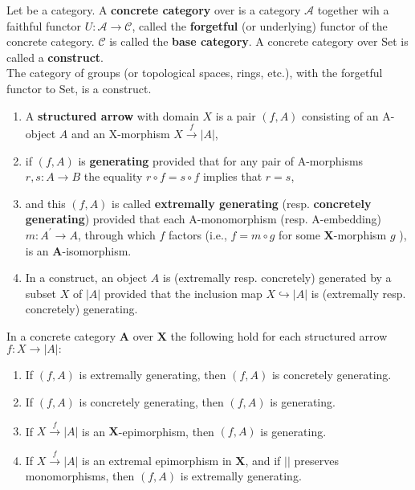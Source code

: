 \begin{example}
Let \cc be a category. A \textbf{concrete category} over \cc is a category $\mathcal{A}$ together wih a faithful functor $U: \mathcal{A} \rightarrow \mathcal{C}$, called the \textbf{forgetful} (or underlying) functor of the concrete category. $\mathcal{C}$ is called the \textbf{base category}. A concrete category over Set is called a \textbf{construct}.\\
The category of groups (or topological spaces, rings, etc.), with the forgetful functor to Set, is a construct.\\

\begin{enumerate}
    \item A \textbf{structured arrow} with domain $X$ is a pair $(f, A)$ consisting of an A-object $A$ and an X-morphism $X \xrightarrow{f}|A|$,
    \item if $(f, A)$ is \textbf{generating} provided that for any pair of A-morphisms $r, s: A \rightarrow B$ the equality $r \circ f=s \circ f$ implies that $r=s$,
    \item and this $(f, A)$ is called \textbf{extremally generating} (resp. \textbf{concretely generating}) provided that each A-monomorphism (resp. A-embedding) $m: A^{\prime} \rightarrow A$, through which $f$ factors (i.e., $f=m \circ g$ for some $\mathbf{X}$-morphism $g$ ), is an $\mathbf{A}$-isomorphism.
    \item In a construct, an object $A$ is (extremally resp. concretely) generated by a subset $X$ of $|A|$ provided that the inclusion map $X \hookrightarrow|A|$ is (extremally resp. concretely) generating.
\end{enumerate}

\begin{prop}
    In a concrete category $\mathbf{A}$ over $\mathbf{X}$ the following hold for each structured arrow $f: X \rightarrow|A|:$
    \begin{enumerate}
        \item If $(f, A)$ is extremally generating, then $(f, A)$ is concretely generating.
        \item If $(f, A)$ is concretely generating, then $(f, A)$ is generating.
        \item If $X \xrightarrow{f}|A|$ is an $\mathbf{X}$-epimorphism, then $(f, A)$ is generating.
        \item If $X \xrightarrow{f}|A|$ is an extremal epimorphism in $\mathbf{X}$, and if $||$ preserves monomorphisms, then $(f, A)$ is extremally generating.
    \end{enumerate}
\end{prop}


\end{example}
